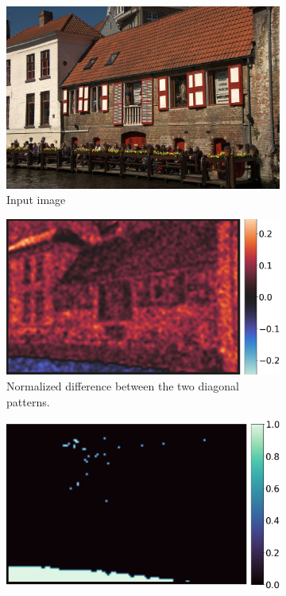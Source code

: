 \documentclass{ipol}
\begin{document}
\begin{figure}[ht]
        \begin{subfigure}[t]{.22\linewidth}
                \includegraphics[width=\linewidth]{images/forged_house/image.jpeg}
                \caption{Input image}
        \end{subfigure}\hfill%
        \begin{subfigure}[t]{.258\linewidth}
                \includegraphics[width=\linewidth]{images/forged_house/out_diff_diag.png}
                \caption{Normalized difference between the two diagonal patterns.}
        \end{subfigure}\hfill%
        \begin{subfigure}[t]{.245\linewidth}
                \includegraphics[width=\linewidth]{images/forged_house/out_inconsistent_diag_fig.png}

\end{subfigure}
\end{figure}
\end{document}
